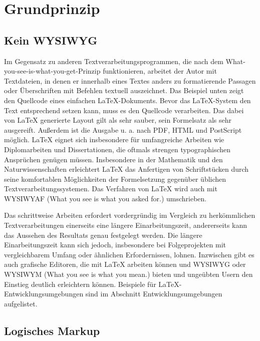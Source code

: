 
\chapter{Grundprinzip}
\label{chapter-basics}

\section{Kein WYSIWYG}

Im Gegensatz zu anderen Textverarbeitungsprogrammen, die nach dem What-you-see-is-what-you-get-Prinzip funktionieren, arbeitet der Autor mit Textdateien, in denen er innerhalb eines Textes anders zu formatierende Passagen oder Überschriften mit Befehlen textuell auszeichnet. Das Beispiel unten zeigt den Quellcode eines einfachen LaTeX-Dokuments. Bevor das LaTeX-System den Text entsprechend setzen kann, muss es den Quellcode verarbeiten. Das dabei von LaTeX generierte Layout gilt als sehr sauber, sein Formelsatz als sehr ausgereift. Außerdem ist die Ausgabe u. a. nach PDF, HTML und PostScript möglich. LaTeX eignet sich insbesondere für umfangreiche Arbeiten wie Diplomarbeiten und Dissertationen, die oftmals strengen typographischen Ansprüchen genügen müssen. Insbesondere in der Mathematik und den Naturwissenschaften erleichtert LaTeX das Anfertigen von Schriftstücken durch seine komfortablen Möglichkeiten der Formelsetzung gegenüber üblichen Textverarbeitungssystemen. Das Verfahren von LaTeX wird auch mit WYSIWYAF (What you see is what you asked for.) umschrieben.

Das schrittweise Arbeiten erfordert vordergründig im Vergleich zu herkömmlichen Textverarbeitungen einerseits eine längere Einarbeitungszeit, andererseits kann das Aussehen des Resultats genau festgelegt werden. Die längere Einarbeitungszeit kann sich jedoch, insbesondere bei Folgeprojekten mit vergleichbarem Umfang oder ähnlichen Erfordernissen, lohnen.\cite{Fenn} Inzwischen gibt es auch grafische Editoren, die mit LaTeX arbeiten können und WYSIWYG oder WYSIWYM (What you see is what you mean.) bieten und ungeübten Usern den Einstieg deutlich erleichtern können. Beispiele für LaTeX-Entwicklungsumgebungen sind im Abschnitt Entwicklungsumgebungen aufgelistet.

\section{Logisches Markup}

